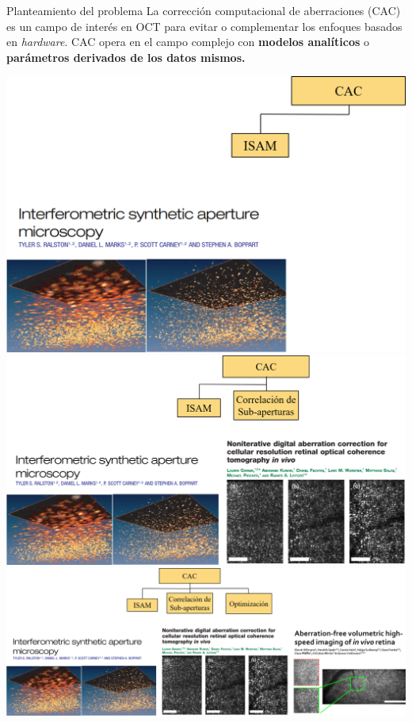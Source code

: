\documentclass[fleqn,10pt,aspectratio=169,dvipsnames]{beamer}
\begin{document}
\begin{frame}[t]{Planteamiento del problema}
La corrección computacional de aberraciones (CAC) es un campo de interés en OCT para evitar o complementar los enfoques basados en \textit{hardware}. CAC opera en el campo complejo con \textbf{modelos analíticos} o \textbf{parámetros derivados de los datos mismos.}
	\begin{center}
		\begin{overprint}
\hspace*{-1\baselineskip}
\includegraphics[height=.55\textheight]{Figuras/ProblemStatement_1.png}
\includegraphics[height=.55\textheight]{Figuras/ProblemStatement_2.png}
\includegraphics[height=.55\textheight]{Figuras/ProblemStatement_3.png}

\end{overprint}
\end{center}
\end{frame}
\end{document}
